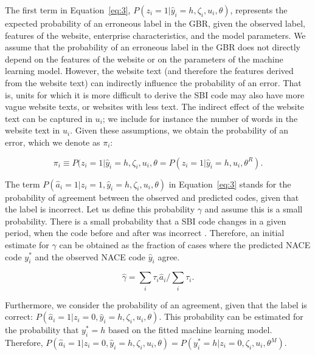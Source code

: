 \documentclass[12pt, a4paper, titlepage]{article}
\begin{document}
The first term in Equation~\ref{eq:3}, $P(z_i = 1|\hat{y}_i = h, \zeta_i, u_i, \theta)$, represents the expected probability of an erroneous label in the GBR, given the observed label, features of the website, enterprise characteristics, and the model parameters. We assume that the probability of an erroneous label in the GBR does not directly depend on the features of the website or on the parameters of the machine learning model. However, the website text (and therefore the features derived from the website text) can indirectly influence the probability of an error. That is, units for which it is more difficult to derive the SBI code may also have more vague website texts, or websites with less text. The indirect effect of the website text can be captured in $u_i$; we include for instance the number of words in the website text in $u_i$. Given these assumptions, we obtain the probability of an error, which we denote as $\pi_i$:

						\begin{equation}\label{eq:pi4}
\pi_i \equiv P(z_i = 1|\hat{y}_i = h, \zeta_i, u_i, \theta = P(z_i = 1|\hat{y}_i = h, u_i, \theta^R) .
						\end{equation} 



The term $P(\hat{a}_i=1|z_i=1, \hat{y}_i = h, \zeta_i, u_i, \theta)$ in Equation~\ref{eq:3} stands for the probability of agreement between the observed and predicted codes, given that the label is incorrect. Let us define this probability 
$\gamma$ and assume this is a small probability. There is a small probability that a SBI code changes in a given period, when the code before and after was incorrect \citep{VanDelden}. Therefore, an initial estimate for $\gamma$ can be obtained as the fraction of cases where the predicted NACE code $y^*_i$ and the observed NACE code $\hat{y}_i$ agree. 

						\begin{equation}\label{eq:gamma5}
\hat{\gamma} = \sum_{i} \tau_i \hat{a}_i / \sum_{i} \tau_i.
						\end{equation} 


Furthermore, we consider the probability of an agreement, given that the label is correct: $P(\hat{a}_i=1|z_i=0, \hat{y}_i = h, \zeta_i, u_i, \theta)$. This probability can be estimated for the probability that $y^*_i = h$ based on the fitted machine learning model. Therefore, $P(\hat{a}_i=1|z_i=0, \hat{y}_i = h, \zeta_i, u_i, \theta) = P(y^*_i = h | z_i = 0, \zeta_i, u_i, \theta^M)$. 
\end{document}
